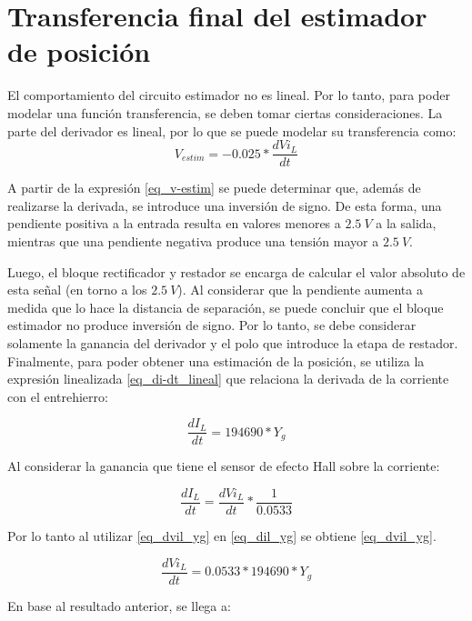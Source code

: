 \section{Transferencia final del estimador de posición}

El comportamiento del circuito estimador no es lineal.  Por lo tanto, para poder modelar una función transferencia, se deben tomar ciertas consideraciones. La parte del derivador es lineal, por lo que se puede modelar su transferencia como:
\begin{equation}\label{eq_v-estim}
	V_{estim}=-0.025*\frac{dVi_L}{dt} 
\end{equation}

A partir de la expresión \ref{eq_v-estim} se puede determinar que, además de realizarse la derivada, se introduce una inversión de signo. De esta forma, una pendiente positiva a la entrada resulta en valores menores a $2.5\:V$ a la salida, mientras que una pendiente negativa produce una tensión mayor a $2.5\:V$.

Luego, el bloque rectificador y restador se encarga de calcular el valor absoluto de esta señal (en torno a los $2.5\:V$). Al considerar que la pendiente aumenta a medida que lo hace la distancia de separación, se puede concluir que el bloque estimador no produce inversión de signo. Por lo tanto, se debe considerar solamente la ganancia del derivador y el polo que introduce la etapa de restador. Finalmente, para poder obtener una estimación de la posición, se utiliza la expresión linealizada \ref{eq_di-dt_lineal} que relaciona la derivada de la corriente con el entrehierro:

\begin{equation} \label{eq_dil_yg}
	\frac{dI_{L}}{dt} = 194690 * Y_{g}
\end{equation}


Al considerar la ganancia que tiene el sensor de efecto Hall sobre la corriente:

\begin{equation} \label{eq_dil_dvil}
	\frac{dI_{L}}{dt} =\frac{dVi_{L}}{dt}*\frac{1}{0.0533}
\end{equation}

Por lo tanto al utilizar \ref{eq_dvil_yg} en \ref{eq_dil_yg} se obtiene \ref{eq_dvil_yg}.

\begin{equation} \label{eq_dvil_yg}
	\frac{dVi_{L}}{dt} = 0.0533*194690*Y_{g}
\end{equation}


En base al resultado anterior, se llega a:




